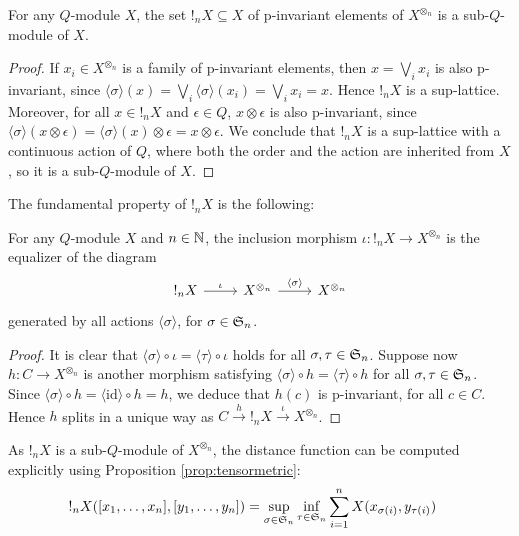 \begin{proposition}
For any $Q$-module $X$, the set $!_{n}X\subseteq X$ of p-invariant elements of $X^{\otimes_{n}}$ is a sub-$Q$-module of $X$.
\end{proposition}
\begin{proof}
If $x_{i}\in X^{\otimes_{n}}$ is a family of p-invariant elements, then 
$x=\bigvee_{i}x_{i}$ is also p-invariant, since $\langle \sigma\rangle (x)=\bigvee_{i}\langle \sigma \rangle (x_{i})=\bigvee_{i}x_{i}=x$. Hence $!_{n}X$ is a sup-lattice.
Moreover, for all $x\in !_{n}X$ and $\epsilon \in Q$, 
$x\otimes \epsilon$ is also p-invariant, since $\langle \sigma \rangle (x\otimes \epsilon)= \langle \sigma \rangle (x)\otimes \epsilon=x\otimes \epsilon$. We conclude that $!_{n}X$ is a sup-lattice with a continuous action of $Q$, where both the order and the action are inherited from $X$, so it is a sub-$Q$-module of $X$.
\end{proof}


The fundamental property of $!_{n}X$ is the following:
\begin{proposition}
For any $Q$-module $X$ and $n\in \mathbb{N}$, the inclusion morphism 
$\iota:!_{n}X\longrightarrow X^{\otimes_{n}}$ is the equalizer of the diagram
$$
\begin{tikzcd}
!_{n}X \ar{r}{\iota} & X^{\otimes_{n}} \ar{r}{\langle \sigma\rangle} & X^{\otimes_{n}}
\end{tikzcd}
$$
generated by all actions $\langle \sigma\rangle$, for $\sigma\in \mathfrak{S}_{n}$.
\end{proposition}
\begin{proof}
It is clear that $\langle \sigma \rangle \circ \iota= \langle \tau\rangle \circ \iota$ holds for all $\sigma, \tau \in \mathfrak{S}_{n}$.
Suppose now $h: C\to X^{\otimes_{n}}$ is another morphism satisfying
$\langle \sigma \rangle \circ h= \langle \tau\rangle \circ h$ for all $\sigma, \tau \in \mathfrak{S}_{n}$.
Since $\langle \sigma \rangle \circ h= \langle \mathrm{id}\rangle \circ h=h$, we deduce that $h(c)$ is p-invariant, for all $c\in C$. Hence $h$ splits in a unique way as $C \stackrel{h}{\to} !_{n}X \stackrel{\iota}{\to} X^{\otimes_{n}}$.
\end{proof}

\begin{remark}
As $!_{n}X$ is a sub-$Q$-module of $X^{\otimes_{n}}$, the distance function can be computed explicitly using Proposition \ref{prop:tensormetric}:
\begin{align*}
!_{n}X( [x_{1},\dots, x_{n}], [y_{1},\dots, y_{n}]) & = 
\sup_{\sigma\in \mathfrak{S}_{n}}\inf_{\tau\in \mathfrak{S}_{n}}
\sum_{i=1}^{n}
X(x_{\sigma(i)},y_{\tau(i)})
\end{align*}
\end{remark}


